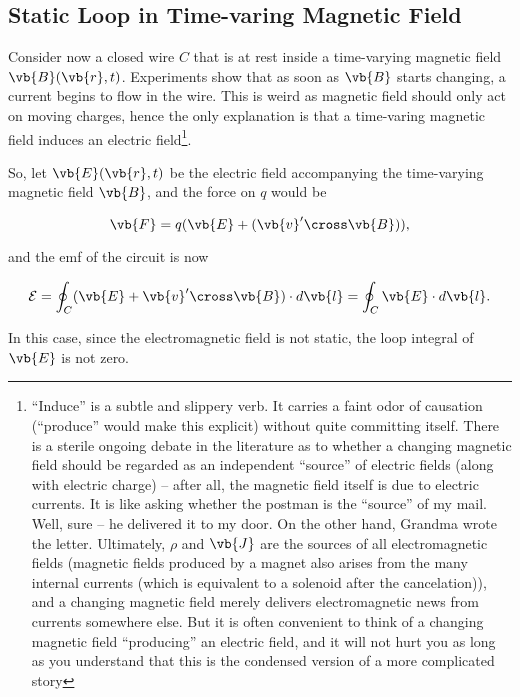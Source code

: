 \documentclass[english,a4paper,12pt]{report}
\begin{document}
\subsection{Static Loop in Time-varing Magnetic Field}

Consider now a closed wire \(C\) that is at rest inside a time-varying magnetic field \(\vb{B} (\vb{r} ,t)\). Experiments show that as soon as \(\vb{B} \) starts changing, a current begins to flow in the wire. This is weird as magnetic field should only act on moving charges, hence the only explanation is that a time-varing magnetic field induces an electric field\footnote{``Induce'' is a subtle and slippery verb. It carries a faint odor of causation (“produce” would make this explicit) without quite committing itself. There is a sterile ongoing debate in the literature as to whether a changing magnetic field should be regarded as an independent “source” of electric fields (along with electric charge) -- after all, the magnetic field itself is due to electric currents. It is like asking whether the postman is the “source” of my mail. Well, sure -- he delivered it to my door. On the other hand, Grandma wrote the letter. Ultimately, \(\rho \)  and \(\vb{J} \)  are the sources of all electromagnetic fields (magnetic fields produced by a magnet also arises from the many internal currents (which is equivalent to a solenoid after the cancelation)), and a changing magnetic field merely delivers electromagnetic news from currents somewhere else. But it is often convenient to think of a changing magnetic field “producing” an electric field, and it will not hurt you as long as you understand that this is the condensed version of a more complicated story}. 
 
So, let \(\vb{E} (\vb{r} ,t)\) be the electric field accompanying the time-varying magnetic field \(\vb{B} \), and the force on \(q\) would be

\begin{equation}
    \vb{F}  = q(\vb{E} + (\vb{v}' \cross \vb{B} )),
\end{equation}

and the emf of the circuit is now

\begin{equation}
    \mathcal{E} = \oint_{C} (\vb{E} + \vb{v} ' \cross \vb{B} ) \cdot d \vb{l} = \oint_{C} \vb{E} \cdot d \vb{l} . 
\end{equation}

In this case, since the electromagnetic field is not static, the loop integral of \(\vb{E} \) is not zero.
\end{document}
